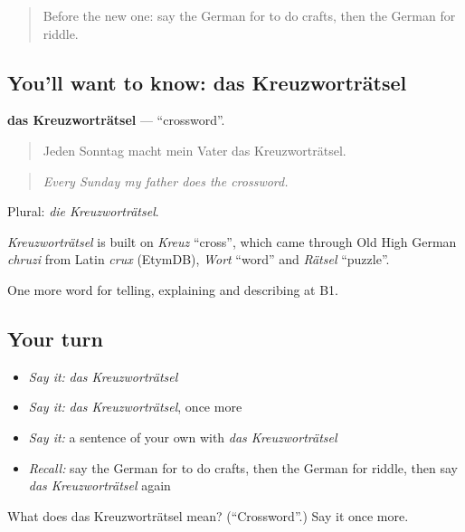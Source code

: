 \label{lesson:GE-C500-kreuzwortraetsel}



\begin{quote}
Before the new one: say the German for to do crafts, then the German for riddle.
\end{quote}

\subsection*{You'll want to know: das Kreuzworträtsel}
\textbf{das Kreuzworträtsel} — \textquotedblleft{}crossword\textquotedblright{}.

\begin{quote}
Jeden Sonntag macht mein Vater das Kreuzworträtsel.
\end{quote}

\begin{quote}
\emph{Every Sunday my father does the crossword.}
\end{quote}

Plural: \emph{die Kreuzworträtsel}.

\begin{cousinweb}
\emph{Kreuzworträtsel} is built on \emph{Kreuz} \textquotedblleft{}cross\textquotedblright{}, which came through Old High German \emph{chruzi} from Latin \emph{crux} (EtymDB), \emph{Wort} \textquotedblleft{}word\textquotedblright{} and \emph{Rätsel} \textquotedblleft{}puzzle\textquotedblright{}.
\end{cousinweb}

\begin{grammarlens}[title={What you've built}]
One more word for telling, explaining and describing at B1.
\end{grammarlens}

\subsection*{Your turn}
\begin{itemize}
\raggedright
  \item \emph{Say it:} \emph{das Kreuzworträtsel}
  \item \emph{Say it:} \emph{das Kreuzworträtsel}, once more
  \item \emph{Say it:} a sentence of your own with \emph{das Kreuzworträtsel}
  \item \emph{Recall:} say the German for to do crafts, then the German for riddle, then say \emph{das Kreuzworträtsel} again
\end{itemize}

\begin{tcolorbox}[breakable,colback=teal!4,colframe=teal!35!black,title={Before you move on}]
What does das Kreuzworträtsel mean? (\textquotedblleft{}Crossword\textquotedblright{}.) Say it once more.
\end{tcolorbox}
